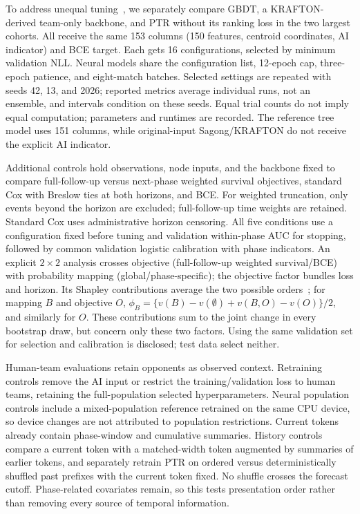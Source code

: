 \documentclass[sigconf,anonymous,nonacm]{acmart}
\begin{document}
To address unequal tuning~\cite{Bergstra12,Cawley10}, we separately compare GBDT, a KRAFTON-derived team-only backbone, and PTR without its ranking loss in the two largest cohorts. All receive the same 153 columns (150 features, centroid coordinates, AI indicator) and BCE target. Each gets 16 configurations, selected by minimum validation NLL. Neural models share the configuration list, 12-epoch cap, three-epoch patience, and eight-match batches. Selected settings are repeated with seeds 42, 13, and 2026; reported metrics average individual runs, not an ensemble, and intervals condition on these seeds. Equal trial counts do not imply equal computation; parameters and runtimes are recorded. The reference tree model uses 151 columns, while original-input Sagong/KRAFTON do not receive the explicit AI indicator.

Additional controls hold observations, node inputs, and the backbone fixed to compare full-follow-up versus next-phase weighted survival objectives, standard Cox with Breslow ties at both horizons, and BCE. For weighted truncation, only events beyond the horizon are excluded; full-follow-up time weights are retained. Standard Cox uses administrative horizon censoring. All five conditions use a configuration fixed before tuning and validation within-phase AUC for stopping, followed by common validation logistic calibration with phase indicators. An explicit $2\times2$ analysis crosses objective (full-follow-up weighted survival/BCE) with probability mapping (global/phase-specific); the objective factor bundles loss and horizon. Its Shapley contributions average the two possible orders~\cite{Shorrocks13}; for mapping $B$ and objective $O$, $\phi_B=\{v(B)-v(\emptyset)+v(B,O)-v(O)\}/2$, and similarly for $O$. These contributions sum to the joint change in every bootstrap draw, but concern only these two factors. Using the same validation set for selection and calibration is disclosed; test data select neither.

Human-team evaluations retain opponents as observed context. Retraining controls remove the AI input or restrict the training/validation loss to human teams, retaining the full-population selected hyperparameters. Neural population controls include a mixed-population reference retrained on the same CPU device, so device changes are not attributed to population restrictions. Current tokens already contain phase-window and cumulative summaries. History controls compare a current token with a matched-width token augmented by summaries of earlier tokens, and separately retrain PTR on ordered versus deterministically shuffled past prefixes with the current token fixed. No shuffle crosses the forecast cutoff. Phase-related covariates remain, so this tests presentation order rather than removing every source of temporal information.
\end{document}
